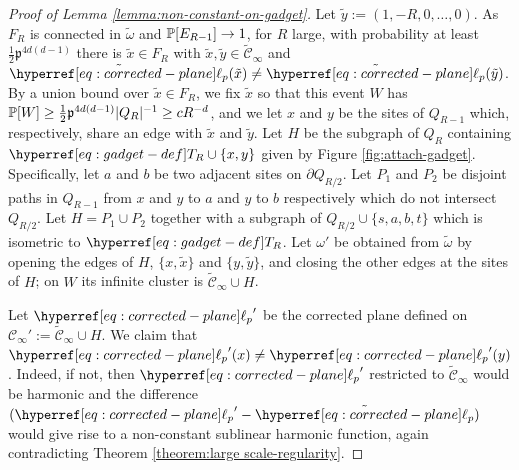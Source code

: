 \documentclass[12pt]{amsart}
\numberwithin{equation}{section}
\begin{document}
\begin{proof}[Proof of Lemma \ref{lemma:non-constant-on-gadget}]
		Let $\tilde y := (1, -R, 0, \ldots, 0)$. As $F_R$ is connected in $\tilde \omega$ and $\P[E_{R-1}] \to 1$, for $R$ large, with probability at least $\frac12 \mathfrak{p}^{4d(d-1)}$ there is $\tilde x \in F_R$ with $\tilde x, \tilde y \in \mathscr{\tilde C}_{\infty}$ and $\tilde{\ellp{p}}(\tilde x) \neq \tilde{\ellp{p}}(\tilde y)$. By a union bound over $\tilde x \in F_R$, we fix $\tilde x$ so that this event $W$ has $\P[W] \geq \frac12 \mathfrak{p}^{4d(d-1)} |Q_R|^{-1} \geq c R^{-d}$, and we let $x$ and $y$ be the sites of $Q_{R-1}$ which, respectively, share an edge with $\tilde x$ and $\tilde y$. Let $H$ be the subgraph of $Q_R$ containing $\Tn{R} \cup \{x, y\}$  given by Figure \ref{fig:attach-gadget}. 
		Specifically, let $a$ and $b$ be two adjacent sites on $\partial Q_{R/2}$. Let $P_1$ and $P_2$ be disjoint paths in $Q_{R-1}$ from $x$ and $y$ to $a$ and $y$ to $b$ respectively which do not intersect $Q_{R/2}$. 
		Let $H = P_1 \cup P_2$ together with a subgraph of $Q_{R/2} \cup \{s, a, b, t\}$ which is isometric to $\Tn{R}$. Let $\omega'$ be obtained from $\tilde \omega$ by opening the edges of $H$, $\{x, \tilde x\}$ and $\{y, \tilde y\}$, and closing the other edges at the sites of $H$; on $W$ its infinite cluster is $\mathscr{\tilde C}_{\infty} \cup H$. 
		
		Let ${\ellp{p}}'$ be the corrected plane defined on $\mathscr{C}_{\infty}' := \mathscr{\tilde C}_{\infty} \cup H$. We claim that ${\ellp{p}}'(x) \neq  {\ellp{p}}'(y)$. Indeed, if not, then ${\ellp{p}}'$ restricted to $\mathscr{\tilde C}_{\infty}$ would be harmonic and the difference $({\ellp{p}}' - \tilde{\ellp{p}})$ would give rise to a non-constant sublinear harmonic function, again contradicting Theorem \ref{theorem:large scale-regularity}. 
		

\end{proof}
\end{document}
